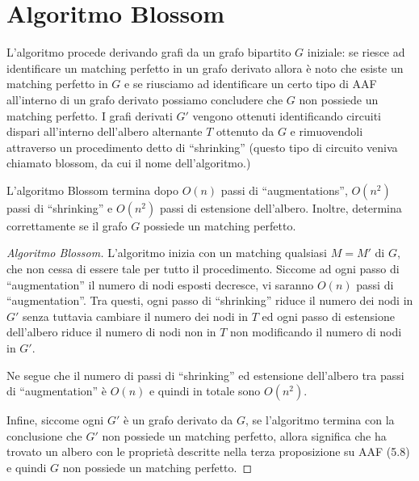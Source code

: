 \documentclass[\main/main.tex]{subfiles}
\begin{document}
\section{Algoritmo Blossom}
L'algoritmo procede derivando grafi da un grafo bipartito \(G\) iniziale: se riesce ad identificare un matching perfetto in un grafo derivato allora è noto che esiste un matching perfetto in \(G\) e se riusciamo ad identificare un certo tipo di AAF all'interno di un grafo derivato possiamo concludere che \(G\) non possiede un matching perfetto. I grafi derivati \(G'\) vengono ottenuti identificando circuiti dispari all'interno dell'albero alternante \(T\) ottenuto da \(G\) e rimuovendoli attraverso un procedimento detto di ``shrinking'' (questo tipo di circuito veniva chiamato blossom, da cui il nome dell'algoritmo.)

\begin{theorem}
	L'algoritmo Blossom termina dopo \(O(n)\) passi di ``augmentations'', \(O(n^2)\) passi di ``shrinking'' e \(O(n^2)\) passi di estensione dell'albero. Inoltre, determina correttamente se il grafo \(G\) possiede un matching perfetto.
\end{theorem}
\begin{proof}[Algoritmo Blossom]
	L'algoritmo inizia con un matching qualsiasi \(M=M'\) di \(G\), che non cessa di essere tale per tutto il procedimento. Siccome ad ogni passo di ``augmentation'' il numero di nodi esposti decresce, vi saranno \(O(n)\) passi di ``augmentation''. Tra questi, ogni passo di ``shrinking'' riduce il numero dei nodi in \(G'\) senza tuttavia cambiare il numero dei nodi in \(T\) ed ogni passo di estensione dell'albero riduce il numero di nodi non in \(T\) non modificando il numero di nodi in \(G'\).

	Ne segue che il numero di passi di ``shrinking'' ed estensione dell'albero tra passi di ``augmentation'' è \(O(n)\) e quindi in totale sono \(O(n^2)\).

	Infine, siccome ogni \(G'\) è un grafo derivato da \(G\), se l'algoritmo termina con la conclusione che \(G'\) non possiede un matching perfetto, allora significa che ha trovato un albero con le proprietà descritte nella terza proposizione su AAF (5.8) e quindi \(G\) non possiede un matching perfetto.
\end{proof}
\end{document}
